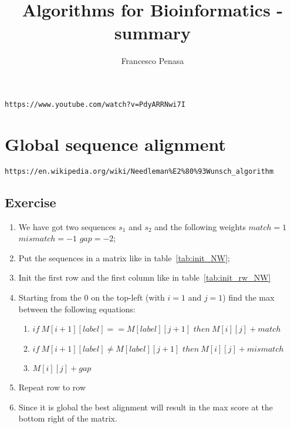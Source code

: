 \documentclass[11pt]{article}
\begin{document}
\author{Francesco Penasa}
\title{Algorithms for Bioinformatics - summary}
\maketitle

\medskip


\texttt{https://www.youtube.com/watch?v=PdyARRNwi7I}
\section{Global sequence alignment} %
\label{sec:global_sequence_alignment}
\texttt{https://en.wikipedia.org/wiki/Needleman\%E2\%80\%93Wunsch\_algorithm}
\subsection{Exercise} %
\label{sub:exercise}
\begin{enumerate}
	\item We have got two sequences $s_1$ and $s_2$ and the following weights $match = 1$ $mismatch = -1$ $gap = -2$;
	\item Put the sequences in a matrix like in table~\ref{tab:init_NW};
	\item Init the first row and the first column like in table~\ref{tab:init_rw_NW}
	\item Starting from the $0$ on the top-left (with $i=1$ and $j=1$) find the max between the following equations: 
	\begin{enumerate}
	 	\item $if\  M[i+1][label] == M[label][j+1]$ $then\ M[i][j] + match$
	 	\item $if\  M[i+1][label] \neq M[label][j+1]$ $then\ M[i][j] + mismatch$
	 	\item $M[i][j] + gap$
 	\end{enumerate} 
 	\item Repeat row to row
 	\item Since it is global the best alignment will result in the max score at the bottom right of the matrix.
\end{enumerate}
\end{document}
